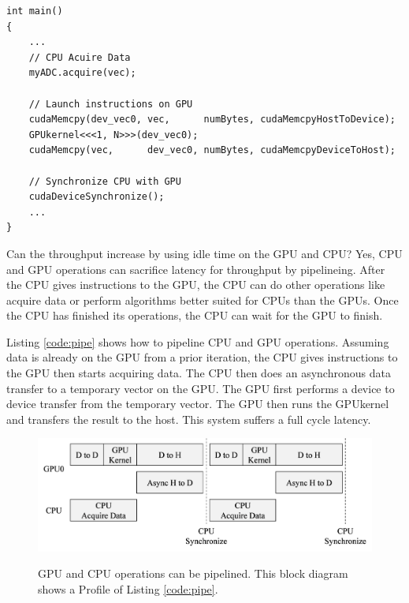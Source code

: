 \clearpage
\singlespacing
\begin{lstlisting}[style=myCUDAstyle,caption={Example code Simple example of the CPU acquiring data from myADC, copying from host to device, processing data on the device then copying from device to host. No processing occurs on device while CPU is acquiring data.},label={code:noPipe}]
int main()
{
	...
	// CPU Acuire Data
	myADC.acquire(vec);
	
	// Launch instructions on GPU 
	cudaMemcpy(dev_vec0, vec,      numBytes, cudaMemcpyHostToDevice);
	GPUkernel<<<1, N>>>(dev_vec0);
	cudaMemcpy(vec,      dev_vec0, numBytes, cudaMemcpyDeviceToHost);
	
	// Synchronize CPU with GPU
	cudaDeviceSynchronize();
	...
}
\end{lstlisting}
\doublespacing

Can the throughput increase by using idle time on the GPU and CPU?
Yes, CPU and GPU operations can sacrifice latency for throughput by pipelineing.
After the CPU gives instructions to the GPU, the CPU can do other operations like acquire data or perform algorithms better suited for CPUs than the GPUs.
Once the CPU has finished its operations, the CPU can wait for the GPU to finish.

Listing \ref{code:pipe} shows how to pipeline CPU and GPU operations.
Assuming data is already on the GPU from a prior iteration, the CPU gives instructions to the GPU then starts acquiring data.
The CPU then does an asynchronous data transfer to a temporary vector on the GPU.
The GPU first performs a device to device transfer from the temporary vector.
The GPU then runs the GPUkernel and transfers the result to the host.
This system suffers a full cycle latency.
\begin{figure}
	\centering\includegraphics[width=9.97in/100*55]{figures/gpu_intro/concurrentCPU_blocking.pdf}
	\label{fig:concurrentCPU_blocking}
	\caption{GPU and CPU operations can be pipelined. This block diagram shows a Profile of Listing \ref{code:pipe}.}
\end{figure}

